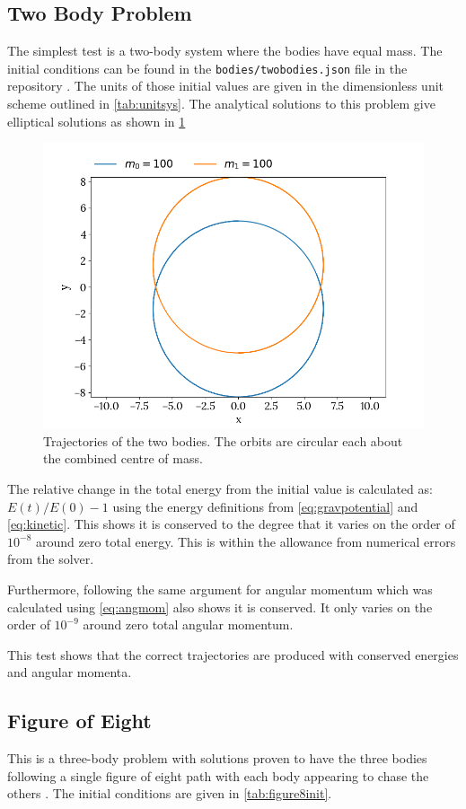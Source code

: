\documentclass{physics_article_B}
\begin{document}
\subsection{Two Body Problem}
\label{ssec:twobody}
The simplest test is a two-body system where the bodies have equal mass. The initial conditions can be found in the \texttt{bodies/twobodies.json} file in the repository \cite{dudgeon_oliverdudgeon/nbody_2019}. The units of those initial values are given in the dimensionless unit scheme outlined in \cref{tab:unitsys}. The analytical solutions to this problem give elliptical solutions as shown in \cref{fig:twobodies}

\begin{figure}[h]
 \centering
 \includegraphics[width=0.8\linewidth]{twobodies.png}
 \caption{Trajectories of the two bodies. The orbits are circular each about the combined centre of mass. }
 \label{fig:twobodies}
\end{figure}

The relative change in the total energy from the initial value is calculated as: $E(t)/E(0) - 1$ using the energy definitions from \cref{eq:gravpotential} and \cref{eq:kinetic}. This shows it is conserved to the degree that it varies on the order of $10^{-8}$ around zero total energy. This is within the allowance from numerical errors from the solver.

Furthermore, following the same argument for angular momentum which was calculated using \cref{eq:angmom} also shows it is conserved. It only varies on the order of $10^{-9}$ around zero total angular momentum.

This test shows that the correct trajectories are produced with conserved energies and angular momenta.

\subsection{Figure of Eight}
This is a three-body problem with solutions proven to have the three bodies following a single figure of eight path with each body appearing to chase the others \cite{chenciner_remarkable_2000}. The initial conditions are given in \cref{tab:figure8init}.
\end{document}
